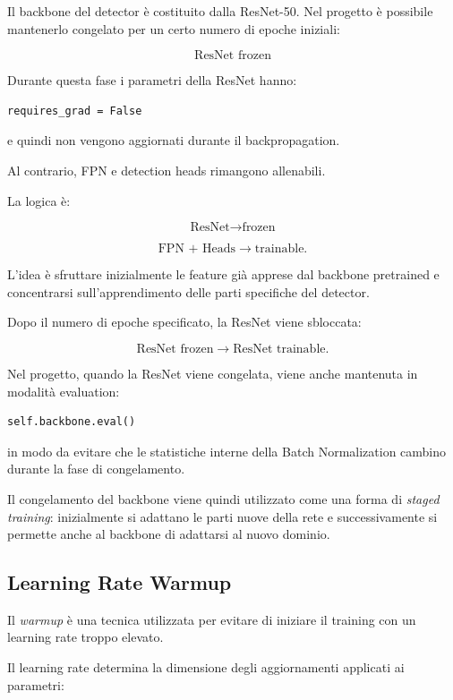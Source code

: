 Il backbone del detector è costituito dalla ResNet-50. Nel progetto è
possibile mantenerlo congelato per un certo numero di epoche iniziali:

\[
\text{ResNet frozen}
\]

Durante questa fase i parametri della ResNet hanno:

\begin{verbatim}
requires_grad = False
\end{verbatim}

e quindi non vengono aggiornati durante il backpropagation.

Al contrario, FPN e detection heads rimangono allenabili.

La logica è:

\[
\text{ResNet}
\rightarrow
\text{frozen}
\]

\[
\text{FPN + Heads}
\rightarrow
\text{trainable}.
\]

L'idea è sfruttare inizialmente le feature già apprese dal backbone
pretrained e concentrarsi sull'apprendimento delle parti specifiche del
detector.

Dopo il numero di epoche specificato, la ResNet viene sbloccata:

\[
\text{ResNet frozen}
\rightarrow
\text{ResNet trainable}.
\]

Nel progetto, quando la ResNet viene congelata, viene anche mantenuta in
modalità evaluation:

\begin{verbatim}
self.backbone.eval()
\end{verbatim}

in modo da evitare che le statistiche interne della Batch Normalization
cambino durante la fase di congelamento.

Il congelamento del backbone viene quindi utilizzato come una forma di
\textit{staged training}: inizialmente si adattano le parti nuove della rete e
successivamente si permette anche al backbone di adattarsi al nuovo dominio.

\subsection{Learning Rate Warmup}

Il \textit{warmup} è una tecnica utilizzata per evitare di iniziare il
training con un learning rate troppo elevato.

Il learning rate determina la dimensione degli aggiornamenti applicati ai
parametri:

